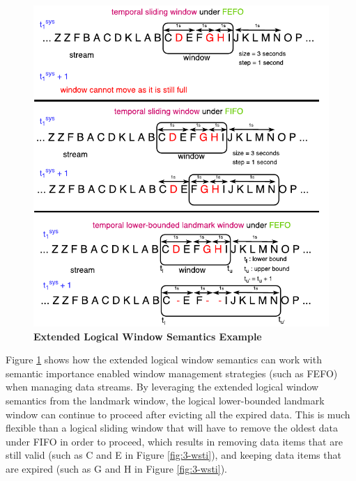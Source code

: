 \begin{figure}[!htbp]
	\centering
    \includegraphics[width=5in]{img/3-psewsti.pdf}
    \caption{\textbf{Extended Logical Window Semantics Example}}
    \label{fig:3-psewsti}
\end{figure}

Figure \ref{fig:3-psewsti} shows how the extended logical window semantics can work with semantic importance enabled window management strategies (such as FEFO) when managing data streams. 
By leveraging the extended logical window semantics from the landmark window, the logical lower-bounded landmark window can continue to proceed after evicting all the expired data.
This is much flexible than a logical sliding window that will have to remove the oldest data under FIFO in order to proceed, which results in removing data items that are still valid (such as C and E in Figure \ref{fig:3-wsti}), and keeping data items that are expired (such as G and H in Figure \ref{fig:3-wsti}). 


